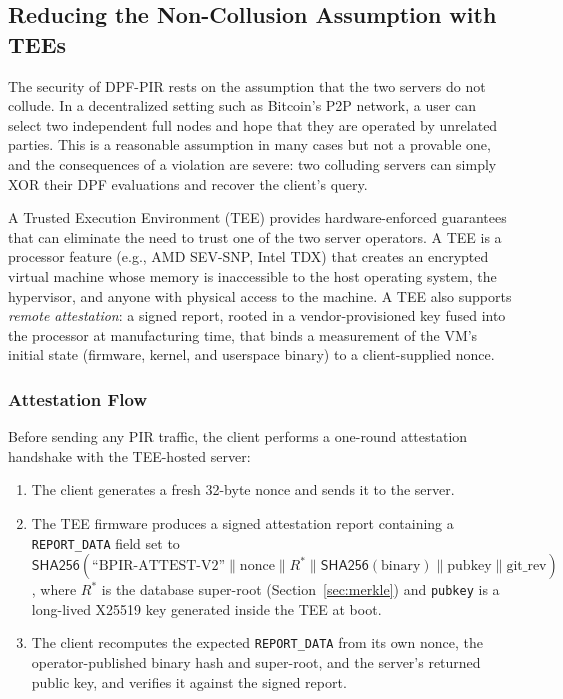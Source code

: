 \subsection{Reducing the Non-Collusion Assumption with TEEs}
\label{sec:tee}

The security of DPF-PIR rests on the assumption that the two servers do not collude. In a decentralized setting such as Bitcoin's P2P network, a user can select two independent full nodes and hope that they are operated by unrelated parties. This is a reasonable assumption in many cases but not a provable one, and the consequences of a violation are severe: two colluding servers can simply XOR their DPF evaluations and recover the client's query.

A Trusted Execution Environment (TEE) \cite{amdsev} provides hardware-enforced guarantees that can eliminate the need to trust one of the two server operators. A TEE is a processor feature (e.g., AMD SEV-SNP, Intel TDX) that creates an encrypted virtual machine whose memory is inaccessible to the host operating system, the hypervisor, and anyone with physical access to the machine. A TEE also supports \emph{remote attestation}: a signed report, rooted in a vendor-provisioned key fused into the processor at manufacturing time, that binds a measurement of the VM's initial state (firmware, kernel, and userspace binary) to a client-supplied nonce.

\subsubsection{Attestation Flow}

Before sending any PIR traffic, the client performs a one-round attestation handshake with the TEE-hosted server:

\begin{enumerate}[nolistsep,leftmargin=*]
    \item The client generates a fresh 32-byte nonce and sends it to the server.
    \item The TEE firmware produces a signed attestation report containing a \texttt{REPORT\_DATA} field set to $\mathsf{SHA256}(\text{``BPIR-ATTEST-V2''} \| \text{nonce} \| R^* \| \mathsf{SHA256}(\text{binary}) \| \text{pubkey} \| \text{git\_rev})$, where $R^*$ is the database super-root (Section~\ref{sec:merkle}) and \texttt{pubkey} is a long-lived X25519 key generated inside the TEE at boot.
    \item The client recomputes the expected \texttt{REPORT\_DATA} from its own nonce, the operator-published binary hash and super-root, and the server's returned public key, and verifies it against the signed report.
\end{enumerate}

